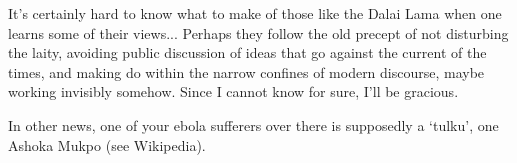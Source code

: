 \begin{footnotesize}
\begin{sffamily}
It's certainly hard to know what to make of those like the Dalai Lama when one learns some of their views... Perhaps they follow the old precept of not disturbing the laity, avoiding public discussion of ideas that go against the current of the times, and making do within the narrow confines of modern discourse, maybe working invisibly somehow. Since I cannot know for sure, I'll be gracious.

In other news, one of your ebola sufferers over there is supposedly a `tulku', one Ashoka Mukpo (see Wikipedia).

\end{sffamily}
\end{footnotesize}

